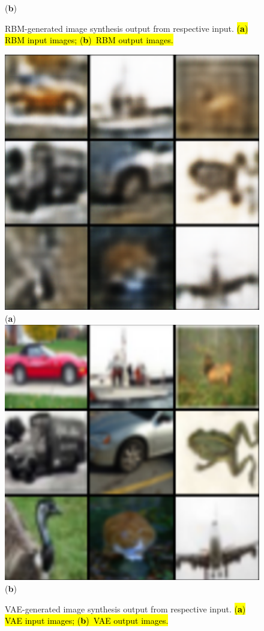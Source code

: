 \documentclass[technologies,article,accept,pdftex,moreauthors]{Definitions/mdpi}
\begin{document}
\begin{figure}[H]
 \text{~~~~~~~~~~~~~~~~~~~~~~~~~~~~~~~~~~~~~~~~~~~~~~~~~~~~~~~~}(\textbf{b}) 
        \label{fig:rbmout} 
    \caption{RBM-generated image synthesis output from respective input. \hl{(\textbf{a}) RBM input images; (\textbf{b})~RBM output images.}%
\label{fig:rbmresults}} 
\end{figure}

\vspace{-9pt}




\begin{figure}[H]
\includegraphics[width=.77\linewidth]{vaein.png}\\
\text{~~~~~~~~~~~~~~~~~~~~~~~~~~~~~~~~~~~~~~~~~~~~~~~~~~~~~~~~}(\textbf{a}) 
        \label{fig:vaein} \\
        \includegraphics[width=.77\linewidth]{vaeout.png}\\
\text{~~~~~~~~~~~~~~~~~~~~~~~~~~~~~~~~~~~~~~~~~~~~~~~~~~~~~~~~}(\textbf{b}) 
        \label{fig:vaeout}  
    \caption{VAE-generated image synthesis output from respective input. \hl{(\textbf{a}) VAE input images; (\textbf{b})~VAE output images.}\label{fig:vaeresults}} 
\end{figure} 
\vspace{-9pt}
\end{document}
